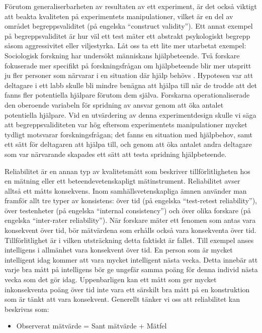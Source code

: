 \documentclass[
]{book}
\providecommand{\tightlist}{%
  \setlength{\itemsep}{0pt}\setlength{\parskip}{0pt}}
\begin{document}
Förutom generaliserbarheten av resultaten av ett experiment, är det också viktigt att beakta kvaliteten på experimentets manipulationer, vilket är en del av området begreppsvaliditet (på engelska ``construct validity''). Ett annat exempel på begreppsvaliditet är hur väl ett test mäter ett abstrakt psykologiskt begrepp såsom aggressivitet eller viljestyrka. Låt oss ta ett lite mer utarbetat exempel: Sociologisk forskning har undersökt människans hjälpbeteende. Två forskare fokuserade mer specifikt på forskningsfrågan om hjälpbeteende blir mer utspritt ju fler personer som närvarar i en situation där hjälp behövs \citep{darley1968bystander}. Hypotesen var att deltagare i ett labb skulle bli mindre benägna att hjälpa till när de trodde att det fanns fler potentiella hjälpare förutom dem själva. Forskarna operationaliserade den oberoende variabeln för spridning av ansvar genom att öka antalet potentiella hjälpare. Vid en utvärdering av denna experimentdesign skulle vi säga att begreppsvaliditeten var hög eftersom experimentets manipulationer mycket tydligt motsvarar forskningsfrågan; det fanns en situation med hjälpbehov, samt ett sätt för deltagaren att hjälpa till, och genom att öka antalet andra deltagare som var närvarande skapades ett sätt att testa spridning hjälpbeteende.

Reliabilitet är en annan typ av kvalitetsmått som beskriver tillförlitligheten hos en mätning eller ett beteendevetenskapligt mätinstrument. Reliabilitet avser alltså ett måtts konsekvens. Inom samhällsvetenskapliga ämnen använder man framför allt tre typer av konsistens: över tid (på engelska ``test-retest reliability''), över testenheter (på engelska ``internal consistency'') och över olika forskare (på engelska ``inter-rater reliability''). När forskare mäter ett fenomen som antas vara konsekvent över tid, bör mätvärdena som erhålls också vara konsekventa över tid. Tillförlitlighet är i vilken utsträckning detta faktiskt är fallet. Till exempel anses intelligens i allmänhet vara konsekvent över tid. En person som är mycket intelligent idag kommer att vara mycket intelligent nästa vecka. Detta innebär att varje bra mått på intelligens bör ge ungefär samma poäng för denna individ nästa vecka som det gör idag. Uppenbarligen kan ett mått som ger mycket inkonsekventa poäng över tid inte vara ett särskilt bra mått på en konstruktion som är tänkt att vara konsekvent. Generellt tänker vi oss att reliabilitet kan beskrivas som:

\begin{itemize}
\tightlist
\item
  Observerat mätvärde = Sant mätvärde + Mätfel
\end{itemize}
\end{document}

